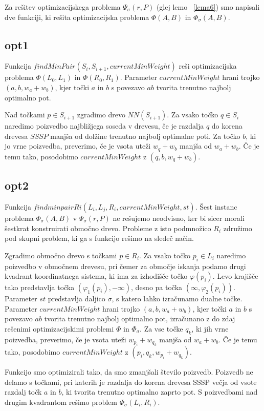 \documentclass[a4paper, 12pt]{book}
\begin{document}
Za rešitev optimizacijskega problema $\Psi_\sigma(r,P)$ (glej lemo ~\ref{lema6}) smo napisali dve funkciji, ki rešita optimizacijska problema $\Phi(A,B)$ in $\Phi_\sigma(A,B)$.

\subsection{opt1}
Funkcija $findMinPair(S_i, S_{i+1}, currentMinWeight)$ reši optimizacijska problema $\Phi(L_0, L_1)$ in $\Phi(R_0, R_1)$. Parameter $currentMinWeight$ hrani trojko $(a, b, w_a + w_b)$, kjer točki $a$ in $b$ s povezavo $ab$ tvorita trenutno najbolj optimalno pot.

Nad točkami $p\in S_{i+1}$ zgradimo drevo $NN(S_{i+1})$. Za vsako točko $q\in S_i$ naredimo poizvedbo najbližjega soseda v drevesu, če je razdalja $q$ do korena drevesa $SSSP$ manjša od dolžine trenutno najbolj optimalne poti. Za točko $b$, ki jo vrne poizvedba, preverimo, če je vsota uteži $w_q + w_b$ manjša od $w_a+w_b$. Če je temu tako, posodobimo $currentMinWeight$ z $(q, b, w_q + w_b)$.

\subsection{opt2}
Funkcija $findminpairRi (L_i, L_j, R_i, currentMinWeight, st)$. Šest instanc problema $\Phi_\sigma(A,B)$ v $\Psi_\sigma(r,P)$ ne rešujemo neodvisno, ker bi sicer morali šestkrat konstruirati območno drevo. Probleme z isto podmnožico $R_i$ združimo pod skupni problem, ki ga s funkcijo rešimo na sledeč način.

Zgradimo območno drevo s točkami $p\in R_i$. Za vsako točko $p_i\in L_i$ naredimo poizvedbo v območnem drevesu, pri čemer za območje iskanja podamo  drugi kvadrant koordinatnega sistema, ki ima za izhodišče točko $\varphi (p_i)$. Levo krajišče tako predstavlja točka $(\varphi_1 (p_i), -\infty)$, desno pa točka $(\infty, \varphi_2 (p_i))$. Parameter $st$ predstavlja daljico $\sigma$, s katero lahko izračunamo dualne točke. Parameter $currentMinWeight$ hrani trojko $(a, b, w_a + w_b)$, kjer točki $a$ in $b$ s povezavo $ab$ tvorita trenutno najbolj optimalno pot, izračunano z do zdaj rešenimi optimizacijskimi problemi $\Phi$ in $\Phi_\sigma$. Za vse točke $q_k$, ki jih vrne poizvedba, preverimo, če je vsota uteži $w_{p_i} + w_{q_k}$ manjša od $w_a+w_b$. Če je temu tako, posodobimo $currentMinWeight$ z $(p_i, q_k, w_{p_i} + w_{q_k})$. 

Funkcijo smo optimizirali tako, da smo zmanjšali število poizvedb. Poizvedb ne delamo s točkami, pri katerih je razdalja do korena drevesa SSSP večja od vsote razdalj točk $a$ in $b$, ki tvorita trenutno optimalno zaprto pot. S poizvedbami nad drugim kvadrantom rešimo problem $\Phi_\sigma(L_i,R_i)$.
\end{document}
